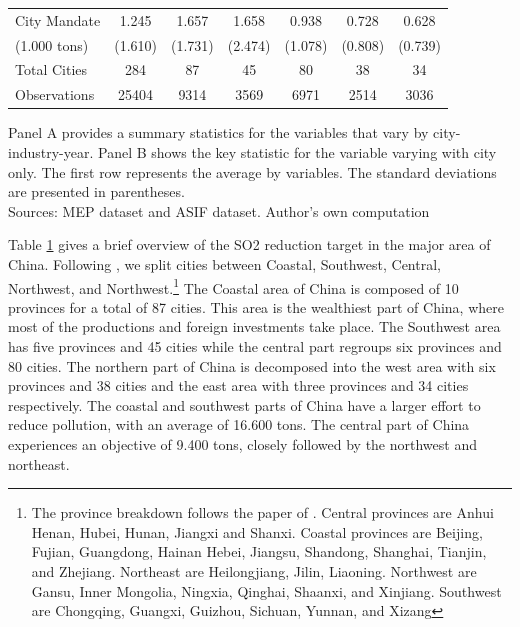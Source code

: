 \documentclass[12pt]{article}
\begin{document}
\begin{table}[htbp]
{\begin{threeparttable}
\begin{tabular}{l*{6}{c}}
    City Mandate &	1.245&	1.657&	1.658&	0.938&	0.728	&0.628\\
    (1.000 tons)&	(1.610)&	(1.731)&	(2.474)	&(1.078)	&(0.808)	&(0.739)\\
    \bottomrule
    
    Total Cities&	284&	87&	45&	80	&38	&34\\
    Observations &	25404&	9314&	3569&	6971&	2514&	3036\\
    \hline
  \end{tabular}
  \begin{tablenotes}
      \small
      \item Panel A provides a summary statistics for the variables that vary by city-industry-year. Panel B shows the key statistic for the variable varying with city only. The first row represents the average by variables. The standard deviations are presented in parentheses. \\
      Sources: MEP dataset and ASIF dataset. Author's own computation 
    \end{tablenotes}
\label{tab:table1}
\end{threeparttable}}
\end{table} 

Table \ref{tab:table1} gives a brief overview of the SO2 reduction target in the major area of China. Following \cite{Wu2017-bl}, we split cities between Coastal, Southwest, Central, Northwest, and Northwest.\footnote{The province breakdown follows the paper of \cite{Wu2017-bl}. Central provinces are Anhui
Henan, Hubei, Hunan, Jiangxi and Shanxi. Coastal provinces are Beijing, Fujian, Guangdong, Hainan
Hebei, Jiangsu, Shandong, Shanghai, Tianjin, and Zhejiang. Northeast are Heilongjiang, Jilin, Liaoning. Northwest are Gansu, Inner Mongolia, Ningxia, Qinghai, Shaanxi, and Xinjiang. Southwest are Chongqing, Guangxi, Guizhou, Sichuan, Yunnan, and Xizang} The Coastal area of China is composed of 10 provinces for a total of 87 cities. This area is the wealthiest part of China, where most of the productions and foreign investments take place. The Southwest area has five provinces and 45 cities while the central part regroups six provinces and 80 cities. The northern part of China is decomposed into the west area with six provinces and 38 cities and the east area with three provinces and 34 cities respectively. The coastal and southwest parts of China have a larger effort to reduce pollution, with an average of 16.600 tons. The central part of China experiences an objective of 9.400 tons, closely followed by the northwest and northeast.
\end{document}
